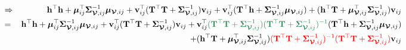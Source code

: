 \documentclass[12pt]{article}
\newcommand{\0}{\mathbf{0}}
\begin{document}
\begin{eqnarray*}
& \Rightarrow & \mathbf{h}^{\top} \mathbf{h} + \boldsymbol{\mu}_{ij}^{\top} \boldsymbol{\Sigma}_{\boldsymbol{\mathcal{V}}, ij}^{-1} \boldsymbol{\mu}_{\boldsymbol{\mathcal{V}}, ij} + \mathbf{v}_{ij}^{\top}  ( \mathbf{T}^{\top} \mathbf{T} + \boldsymbol{\Sigma}_{\boldsymbol{\mathcal{V}}, ij}^{-1} ) \mathbf{v}_{ij} + \mathbf{v}_{ij}^{\top} ( \mathbf{T}^{\top} \mathbf{h} + \boldsymbol{\Sigma}_{\boldsymbol{\mathcal{V}}, ij}^{-1}\boldsymbol{\mu}_{\boldsymbol{\mathcal{V}}, ij} ) + ( \mathbf{h}^{\top} \mathbf{T} + \boldsymbol{\mu}_{\boldsymbol{\mathcal{V}}, ij}^{\top} \boldsymbol{\Sigma}_{\boldsymbol{\mathcal{V}}, ij}^{-1}) \mathbf{v}_{ij} \\
& = & \mathbf{h}^{\top} \mathbf{h} + \boldsymbol{\mu}_{ij}^{\top} \boldsymbol{\Sigma}_{\boldsymbol{\mathcal{V}}, ij}^{-1} \boldsymbol{\mu}_{\boldsymbol{\mathcal{V}}, ij} + \mathbf{v}_{ij}^{\top} ( \mathbf{T}^{\top} \mathbf{T} + \boldsymbol{\Sigma}_{\boldsymbol{\mathcal{V}}, ij}^{-1} ) \mathbf{v}_{ij} + \mathbf{v}_{ij}^{\top} \textcolor{seagreen}{( \mathbf{T}^{\top} \mathbf{T} + \boldsymbol{\Sigma}_{\boldsymbol{\mathcal{V}}, ij}^{-1} ) ( \mathbf{T}^{\top} \mathbf{T} + \boldsymbol{\Sigma}_{\boldsymbol{\mathcal{V}}, ij}^{-1} )^{-1} } (\mathbf{T}^{\top} \mathbf{h} + \boldsymbol{\Sigma}_{\boldsymbol{\mathcal{V}}, ij}^{-1}\boldsymbol{\mu}_{\boldsymbol{\mathcal{V}}, ij} ) \\
&& + ( \mathbf{h}^{\top} \mathbf{T} + \boldsymbol{\mu}_{\boldsymbol{\mathcal{V}}, ij}^{\top} \boldsymbol{\Sigma}_{\boldsymbol{\mathcal{V}}, ij}^{-1}) \textcolor{red}{( \mathbf{T}^{\top} \mathbf{T} + \boldsymbol{\Sigma}_{\boldsymbol{\mathcal{V}}, ij}^{-1} )^{-1} ( \mathbf{T}^{\top} \mathbf{T} + \boldsymbol{\Sigma}_{\boldsymbol{\mathcal{V}}, ij}^{-1} )} \mathbf{v}_{ij} 
\end{eqnarray*}
\end{document}
